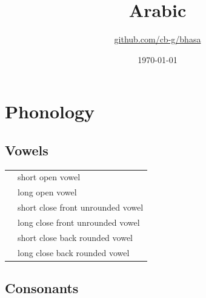 \documentclass{article}
\title{Arabic\\\ipa{[al Qara"bij:a]}}
\author{\href{https://github.com/cb-g/bhasa}{github.com/cb-g/bhasa}}
\date{\today}
\begin{document}
\pagecolor{custom_bg}\color{custom_fg}
\maketitle\thispagestyle{empty}

\newpage\setcounter{page}{1}\section{Phonology}

\subsection{Vowels}

\begin{xltabular}{\textwidth}{lL}
   & short open vowel \\
   & long open vowel \\
   & short close front unrounded vowel \\
   & long close front unrounded vowel \\
   & short close back rounded vowel \\
   & long close back rounded vowel \\
\end{xltabular}

\subsection{Consonants}
\end{document}
